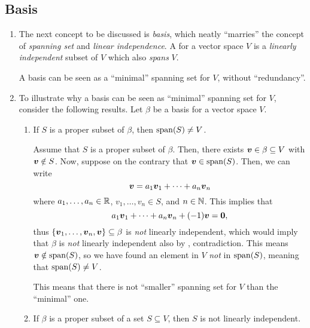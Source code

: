 \subsection{Basis}
\begin{enumerate}
\item The next concept to be discussed is \emph{basis}, which neatly
``marries'' the concept of \emph{spanning set} and \emph{linear independence}.
A  for a vector space \(V\) is a \emph{linearly independent} subset
of \(V\) which also \emph{spans} \(V\).

\begin{intuition}
A basis can be seen as a ``minimal'' spanning set for \(V\), without
``redundancy''.
\end{intuition}

\item To illustrate why a basis can be seen as
``minimal'' spanning set for \(V\), consider the following results. Let
\(\beta\) be a basis for a vector space \(V\).
\begin{enumerate}
\item \label{it:span-set-not-smaller-than-basis} If \(S\) is a proper subset of \(\beta\), then \(\operatorname{span}(S)\ne V\).

\begin{pf}
Assume that \(S\) is a proper subset of \(\beta\). Then, there exists
\(\vb*{v}\in\beta\subseteq V\) with \(\vb*{v}\notin S\). Now, suppose on the
contrary that \(\vb*{v}\in\operatorname{span}(S)\). Then, we can write
\[
\vb*{v}=a_1\vb*{v}_1+\dotsb+a_n\vb*{v}_n
\]
where \(a_1,\dotsc,a_n\in\mathbb{R}\), \(v_1,\dotsc,v_n\in S\), and \(n\in\mathbb{N}\).
This implies that
\[
a_1\vb*{v}_1+\dotsb+a_n\vb*{v}_n+(-1)\vb*{v}=\vb*{0},
\]
thus \(\{\vb*{v}_1,\dotsc,\vb*{v}_n,\vb*{v}\}\subseteq \beta\) is \emph{not}
linearly independent, which would imply that \(\beta\) is \emph{not} linearly
independent also by , contradiction. This means
\(\vb*{v}\notin\operatorname{span}(S)\), so we have found an element in \(V\) \emph{not} in
\(\operatorname{span}(S)\), meaning that \(\operatorname{span}(S)\ne V\).
\end{pf}

\begin{intuition}
This means that there is not ``smaller'' spanning set for \(V\) than the
``minimal'' one.
\end{intuition}
\item \label{it:span-set-greater-than-basis-ld} If \(\beta\) is a proper subset of a set \(S\subseteq V\), then \(S\) is
not linearly independent.


\end{enumerate}
\end{enumerate}
